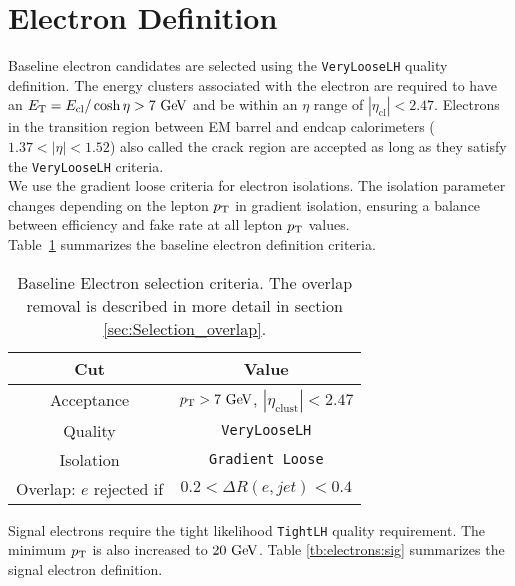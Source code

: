 \section{Electron Definition}  \label{sec:EleDef}

\indent Baseline electron candidates are selected using the {\tt VeryLooseLH} quality definition. The energy clusters associated with the electron are required to have an $\et = E_{\mathrm{cl}} / \cosh{\eta} > 7 \gev$ and be within an $\eta$ range of $|\eta_{\mathrm{cl}}| < 2.47$. Electrons in the transition region between EM barrel and endcap calorimeters ($1.37 < |\eta| < 1.52$) also called the crack region are accepted as long as they satisfy the {\tt VeryLooseLH} criteria. \\

\indent We use the gradient loose criteria for electron isolations. The isolation parameter changes depending on the lepton $p_{\mathrm{T}}$ in gradient isolation, ensuring a balance between efficiency and fake rate at all lepton $p_{\mathrm{T}}$ values. \\

\indent Table~\ref{tb:electrons:baseline} summarizes the baseline electron definition criteria.   


\begin{table}[htp]
  \caption{Baseline Electron selection criteria. The overlap removal is described in more detail in section \ref{sec:Selection_overlap}.}
  \begin{center}
    \begin{tabular}{c|c} \hline \hline
      Cut & Value \\ \hline \hline
      Acceptance & $\pT > 7 \gev$, $|\eta_{\mathrm{clust}}| < 2.47$ \\ \hline
      Quality & {\tt VeryLooseLH} \\ \hline
      Isolation & {\tt Gradient Loose} \\ \hline
      Overlap: $e$ rejected if &  $0.2 < \Delta R(e,jet) < 0.4$\\ \hline%
      \hline
    \end{tabular}
  \end{center}
  \label{tb:electrons:baseline}
\end{table}%

\indent Signal electrons require the tight likelihood {\tt TightLH} quality requirement.  The minimum $p_{\mathrm{T}}$ is also increased to $20 \gev$.  Table \ref{tb:electrons:sig} summarizes the signal electron definition. \\


